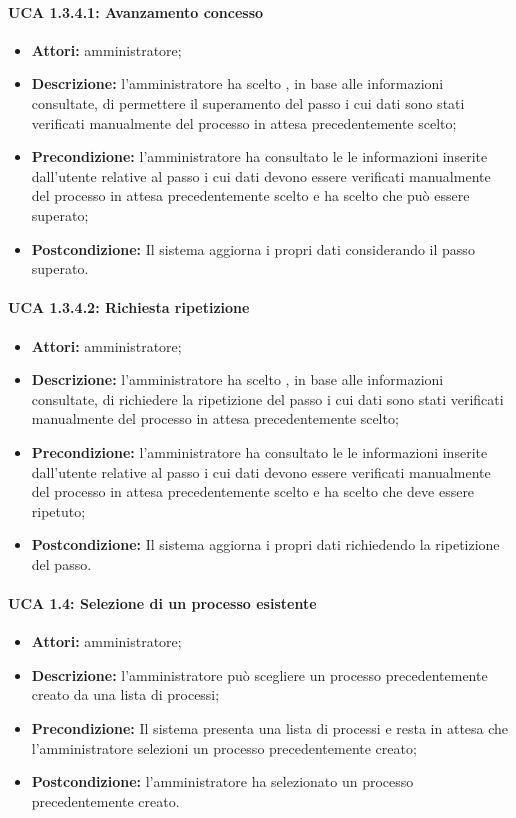 \paragraph{UCA 1.3.4.1: Avanzamento concesso}
\begin{itemize}
\item \textbf{Attori:} 
amministratore;
\item \textbf{Descrizione:} 
l'amministratore ha scelto , in base alle informazioni consultate, di permettere il superamento del passo i cui dati sono stati verificati manualmente del processo in attesa precedentemente scelto;
\item \textbf{Precondizione:} 
l'amministratore ha consultato le le informazioni inserite dall'utente relative al passo i cui dati devono essere verificati manualmente del processo in attesa precedentemente scelto e ha scelto che può essere superato;
\item \textbf{Postcondizione:} 
Il sistema aggiorna i propri dati considerando il passo superato.
\end{itemize}

\paragraph{UCA 1.3.4.2: Richiesta ripetizione}
\begin{itemize}
\item \textbf{Attori:} 
amministratore;
\item \textbf{Descrizione:} 
l'amministratore ha scelto , in base alle informazioni consultate, di richiedere la ripetizione del passo i cui dati sono stati verificati manualmente del processo in attesa precedentemente scelto;
\item \textbf{Precondizione:} 
l'amministratore ha consultato le le informazioni inserite dall'utente relative al passo i cui dati devono essere verificati manualmente del processo in attesa precedentemente scelto e ha scelto che deve essere ripetuto;
\item \textbf{Postcondizione:} 
Il sistema aggiorna i propri dati richiedendo la ripetizione del passo.
\end{itemize}

\paragraph{UCA 1.4: Selezione di un processo esistente}
\begin{itemize}
\item \textbf{Attori:} 
amministratore;
\item \textbf{Descrizione:} 
l'amministratore può scegliere un processo precedentemente creato da una lista di processi; 
\item \textbf{Precondizione:} 
Il sistema presenta una lista di processi e resta in attesa che l'amministratore selezioni un processo precedentemente creato;
\item \textbf{Postcondizione:} 
l'amministratore ha selezionato un processo precedentemente creato.
\end{itemize}

